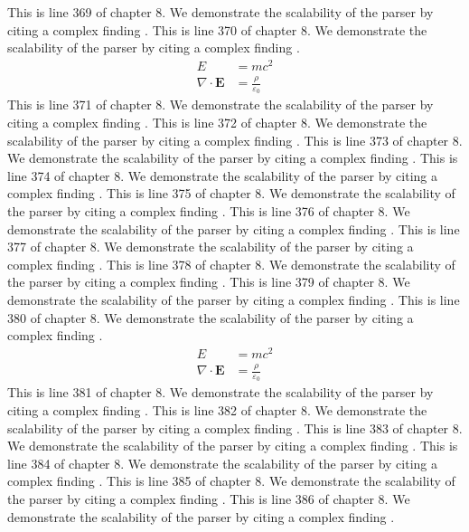 This is line 369 of chapter 8. We demonstrate the scalability of the parser by citing a complex finding \cite{ref8_369}.
This is line 370 of chapter 8. We demonstrate the scalability of the parser by citing a complex finding \cite{ref8_370}.
\begin{align*}
  E &= mc^2 \\
  \nabla \cdot \mathbf{E} &= \frac{\rho}{\varepsilon_0}
\end{align*}
This is line 371 of chapter 8. We demonstrate the scalability of the parser by citing a complex finding \cite{ref8_371}.
This is line 372 of chapter 8. We demonstrate the scalability of the parser by citing a complex finding \cite{ref8_372}.
This is line 373 of chapter 8. We demonstrate the scalability of the parser by citing a complex finding \cite{ref8_373}.
This is line 374 of chapter 8. We demonstrate the scalability of the parser by citing a complex finding \cite{ref8_374}.
This is line 375 of chapter 8. We demonstrate the scalability of the parser by citing a complex finding \cite{ref8_375}.
This is line 376 of chapter 8. We demonstrate the scalability of the parser by citing a complex finding \cite{ref8_376}.
This is line 377 of chapter 8. We demonstrate the scalability of the parser by citing a complex finding \cite{ref8_377}.
This is line 378 of chapter 8. We demonstrate the scalability of the parser by citing a complex finding \cite{ref8_378}.
This is line 379 of chapter 8. We demonstrate the scalability of the parser by citing a complex finding \cite{ref8_379}.
This is line 380 of chapter 8. We demonstrate the scalability of the parser by citing a complex finding \cite{ref8_380}.
\begin{align*}
  E &= mc^2 \\
  \nabla \cdot \mathbf{E} &= \frac{\rho}{\varepsilon_0}
\end{align*}
This is line 381 of chapter 8. We demonstrate the scalability of the parser by citing a complex finding \cite{ref8_381}.
This is line 382 of chapter 8. We demonstrate the scalability of the parser by citing a complex finding \cite{ref8_382}.
This is line 383 of chapter 8. We demonstrate the scalability of the parser by citing a complex finding \cite{ref8_383}.
This is line 384 of chapter 8. We demonstrate the scalability of the parser by citing a complex finding \cite{ref8_384}.
This is line 385 of chapter 8. We demonstrate the scalability of the parser by citing a complex finding \cite{ref8_385}.
This is line 386 of chapter 8. We demonstrate the scalability of the parser by citing a complex finding \cite{ref8_386}.
